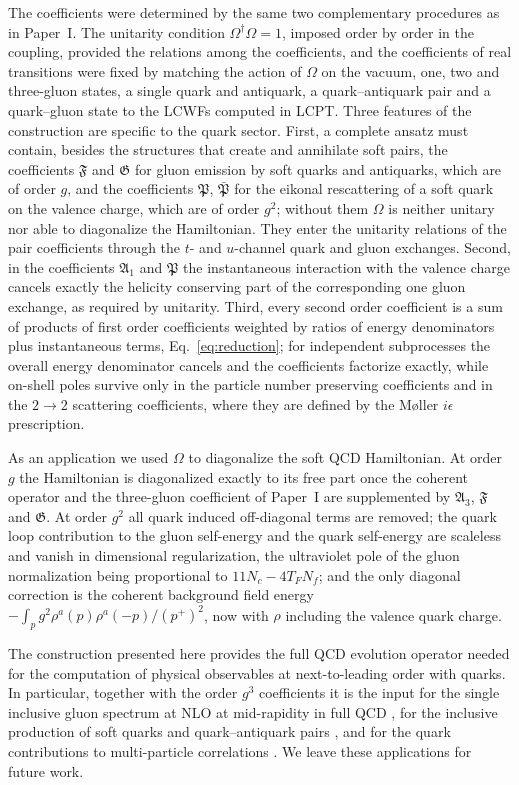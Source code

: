 \documentclass[11pt,a4paper]{article}
\numberwithin{equation}{section}
\newcommand{\mf}[1]{\mathfrak{#1}}
\newcommand{\dg}{\dagger}
\newcommand{\OM}{\Omega}
\newcommand{\Nf}{N_{f}}
\begin{document}
The coefficients were determined by the same two complementary procedures as in Paper~I. The
unitarity condition $\OM^{\dg}\OM=1$, imposed order by order in the coupling, provided the relations
among the coefficients, and the coefficients of real transitions were fixed by matching the action of
$\OM$ on the vacuum, one, two and three-gluon states, a single quark and antiquark, a quark--antiquark
pair and a quark--gluon state to the LCWFs computed in LCPT. Three features of the construction are
specific to the quark sector. First, a complete ansatz must contain, besides the structures that
create and annihilate soft pairs, the coefficients $\mf F$ and $\mf G$ for gluon emission by soft quarks
and antiquarks, which are of order $g$, and the coefficients $\mf P$, $\bar{\mf P}$ for the eikonal
rescattering of a soft quark on the valence charge, which are of order $g^{2}$; without them $\OM$ is
neither unitary nor able to diagonalize the Hamiltonian. They enter the unitarity relations of the
pair coefficients through the $t$- and $u$-channel quark and gluon exchanges. Second, in the
coefficients $\mf A_{1}$ and $\mf P$ the instantaneous interaction with the valence charge cancels
exactly the helicity conserving part of the corresponding one gluon exchange, as required by
unitarity. Third, every second order coefficient is a sum of products of first order coefficients
weighted by ratios of energy denominators plus instantaneous terms, Eq.~\eqref{eq:reduction}; for
independent subprocesses the overall energy denominator cancels and the coefficients factorize
exactly, while on-shell poles survive only in the particle number preserving coefficients and in the
$2\to2$ scattering coefficients, where they are defined by the M{\o}ller $i\epsilon$ prescription.

As an application we used $\OM$ to diagonalize the soft QCD Hamiltonian. At order $g$ the
Hamiltonian is diagonalized exactly to its free part once the coherent operator and the three-gluon
coefficient of Paper~I are supplemented by $\mf A_{3}$, $\mf F$ and $\mf G$. At order $g^{2}$ all quark
induced off-diagonal terms are removed; the quark loop contribution to the gluon self-energy and the
quark self-energy are scaleless and vanish in dimensional regularization, the ultraviolet pole of the
gluon normalization being proportional to $11N_{c}-4T_{F}\Nf$; and the only diagonal correction is the
coherent background field energy $-\int_{p}g^{2}\rho^{a}(p)\rho^{a}(-p)/(p^{+})^{2}$, now with $\rho$ including
the valence quark charge.

The construction presented here provides the full QCD evolution operator needed for the computation
of physical observables at next-to-leading order with quarks. In particular, together with the
order $g^{3}$ coefficients it is the input for the single inclusive gluon spectrum at NLO at
mid-rapidity in full QCD \cite{LRS:inprep}, for the inclusive production of soft quarks and
quark--antiquark pairs \cite{Blaizot:2004wv,Kovchegov:2006qn}, and for the quark contributions to
multi-particle correlations \cite{Kovner:2011pe,Altinoluk:2018byz}. We leave these applications for
future work.
\end{document}
